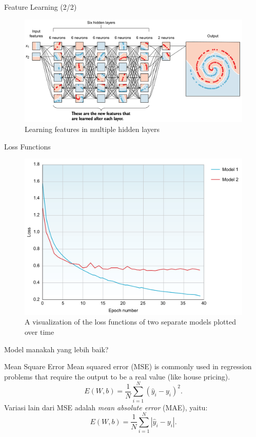 \documentclass{beamer}
\begin{document}
\begin{frame}{Feature Learning (2/2)}
	\begin{figure}[ht]
		\centering
		\includegraphics[scale=0.19]{images/feature-learning}
		\caption{Learning features in multiple hidden layers}
	\end{figure}								
\end{frame}

\begin{frame}{Loss Functions}
	\begin{figure}[ht]
		\centering
		\includegraphics[scale=0.2]{images/loss-functions}
		\caption{A visualization of the loss functions of two separate models plotted over time}
	\end{figure}								
	 Model manakah yang lebih baik?
\end{frame}

\begin{frame}{Mean Square Error}
	Mean squared error (MSE) is commonly used in regression problems that require the output to be a real value (like house pricing).
	\begin{equation*}
		E(W,b) = \frac{1}{N} \sum_{i=1}^N{(\hat{y}_i - y_i)^2}.
	\end{equation*}
	Variasi lain dari MSE adalah \textit{mean absolute error} (MAE), yaitu:
	\begin{equation*}
	E(W,b) = \frac{1}{N} \sum_{i=1}^N{\left| \hat{y}_i - y_i \right| }.
	\end{equation*}
\end{frame}
\end{document}
